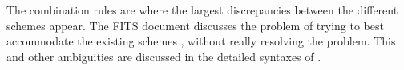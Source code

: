 \documentclass[11pt,notitlepage,onecolumn]{ivoa}
\def\eg{e.g.~}
\newcommand{\unit}[1]{\textbf{\textsf{\color{orange}#1}}}
\begin{document}
The combination rules are where the largest discrepancies between the
different schemes appear. The FITS document discusses the problem of
trying to best accommodate the existing schemes
\cite[\S4.3.1]{pence10}, without really resolving the problem.
\label{sec:fitsquote}
This and other ambiguities are discussed in the detailed syntaxes of .
\end{document}

